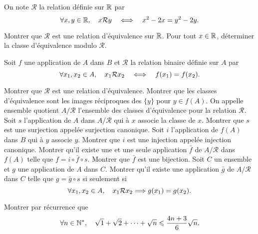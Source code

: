 \documentclass{magnolia}
\begin{document}

On note $\mathcal{R}$ la relation définie sur $\mathbb{R}$ par
\[\forall x,y\in\mathbb{R},\quad x\mathcal{R}y \quad\Longleftrightarrow\quad x^2 - 2x = y^2 - 2y.\]
\begin{questions}
\question Montrer que $\mathcal{R}$ est une relation d'équivalence sur $\mathbb{R}$.
\question Pour tout $x\in\mathbb{R}$, déterminer la classe d'équivalence modulo $\mathcal{R}$.
\end{questions}

Soit $f$ une application de $A$ dans $B$ et $\mathcal{R}$ la relation binaire définie sur $A$ par
\[\forall x_1,x_2 \in A ,\quad x_1\mathcal{R}x_2 \quad\Longleftrightarrow\quad
  f(x_1)=f(x_2).\]
\begin{questions}
\question Montrer que $\mathcal{R}$ est une relation d'équivalence.
\question Montrer que les classes d'équivalence sont les images réciproques des
  $\{y\}$ pour $y\in f(A)$.
\enonce On appelle ensemble quotient $A/\mathcal{R}$ l'ensemble des classes d'équivalence pour la relation $\mathcal{R}$.
\question Soit $s$ l'application de $A$ dans $A/\mathcal{R}$ qui à $x$ associe la classe de
  $x$. Montrer que $s$ est une surjection appelée surjection canonique.
\question Soit $i$ l'application de $f(A)$ dans $B$ qui à $y$ associe $y$. Montrer
  que $i$ est une injection appelée injection canonique.
\question Montrer qu'il existe une et une seule application $\bar{f}$ de $A/\mathcal{R}$
  dans $f(A)$ telle que $f=i\circ \bar{f}\circ s$. Montrer que $\bar{f}$ est une
  bijection.
\question Soit $C$ un ensemble et $g$ une application de $A$ dans $C$. Montrer
  qu'il existe une application $\bar{g}$ de $A/\mathcal{R}$ dans $C$ telle que
  $g=\bar{g}\circ s$ si seulement si
  $$\forall x_1,x_2 \in A ,\quad x_1\mathcal{R}x_2 \Longrightarrow g(x_1)=g(x_2).$$
\end{questions}



Montrer par récurrence que
\[\forall n\in{\mathbb{N}^*},\quad \sqrt{1}+\sqrt{2}+\cdots+\sqrt{n}\leqslant \frac{4n+3}{6}\sqrt{n}.\]
\end{document}

